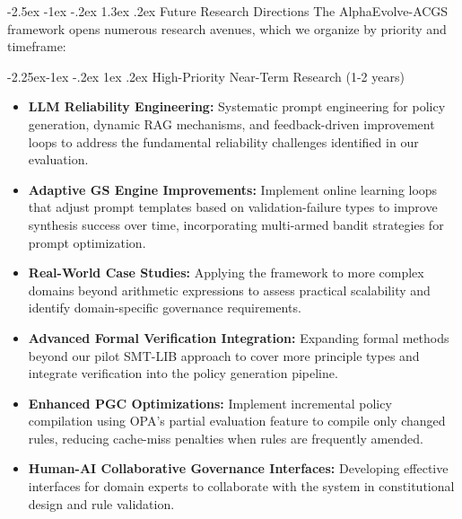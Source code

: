 \documentclass[manuscript,screen,review,anonymous,9pt]{acmart}
\makeatletter
\renewcommand\section{\@startsection{section}{1}{\z@}%
  {-2.5ex \@plus -1ex \@minus -.2ex}%
  {1.3ex \@plus.2ex}%
  {\normalfont\Large\bfseries}}
\renewcommand\subsection{\@startsection{subsection}{2}{\z@}%
  {-2.25ex\@plus -1ex \@minus -.2ex}%
  {1ex \@plus .2ex}%
  {\normalfont\large\bfseries}}
\makeatother
\begin{document}
\section{Future Research Directions}
\label{sec:future_work}
The AlphaEvolve-ACGS framework opens numerous research avenues, which we organize by priority and timeframe:

\subsection{High-Priority Near-Term Research (1-2 years)}
\label{subsec:near_term_research}
\begin{itemize}
    \item \textbf{LLM Reliability Engineering:} Systematic prompt engineering for policy generation, dynamic RAG mechanisms, and feedback-driven improvement loops to address the fundamental reliability challenges identified in our evaluation.
    \item \textbf{Adaptive GS Engine Improvements:} Implement online learning loops that adjust prompt templates based on validation-failure types to improve synthesis success over time, incorporating multi-armed bandit strategies for prompt optimization.
    \item \textbf{Real-World Case Studies:} Applying the framework to more complex domains beyond arithmetic expressions to assess practical scalability and identify domain-specific governance requirements.
    \item \textbf{Advanced Formal Verification Integration:} Expanding formal methods beyond our pilot SMT-LIB approach to cover more principle types and integrate verification into the policy generation pipeline.
    \item \textbf{Enhanced PGC Optimizations:} Implement incremental policy compilation using OPA's partial evaluation feature to compile only changed rules, reducing cache-miss penalties when rules are frequently amended.
    \item \textbf{Human-AI Collaborative Governance Interfaces:} Developing effective interfaces for domain experts to collaborate with the system in constitutional design and rule validation.
\end{itemize}
\end{document}
